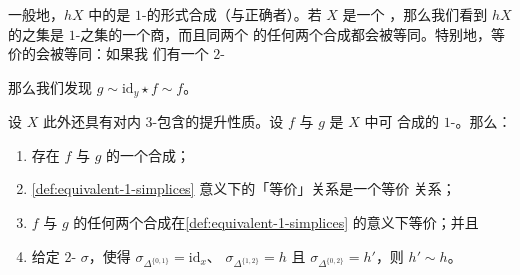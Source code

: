 \begin{observation}\label{obs:composer-hx-quotient}
一般地，$hX$ 中的\trMorphism{}是 $1$-\trSimplex{}的形式合成（\trSource{}与\trTarget{}正确者）。若 $X$ 是一个%
\trComposer{}，那么我们看到 $hX$ 的\trMorphism{}之集是 $1$-\trSimplex{}之集的一个商，而且同两个%
\trMorphism{}的任何两个合成都会被等同。特别地，等价的\trMorphism{}会被等同：如果我
们有一个 $2$-\trSimplex{}%
\begin{center}
\end{center}
那么我们发现 $g \sim \mathrm{id}_y \star f \sim f$。
\end{observation}

\begin{lemma}\label{lem:composer-inner-3-horn}
设\trComposer{} $X$ 此外还具有对内 $3$-\trHorn{}包含的提升性质。设 $f$ 与 $g$ 是 $X$ 中可
合成的 $1$-\trSimplex{}。那么：
\begin{enumerate}[label=(\arabic*)]
  \item 存在 $f$ 与 $g$ 的一个合成；
  \item \cref{def:equivalent-1-simplices} 意义下\trMorphism{}的「等价」关系是一个等价
  关系；
  \item $f$ 与 $g$ 的任何两个合成在\cref{def:equivalent-1-simplices} 的意义下等价；并且
  \item 给定 $2$-\trSimplex{} $\sigma$，使得 $\sigma_{\Delta^{\{0,1\}}} = \mathrm{id}_x$、
  $\sigma_{\Delta^{\{1,2\}}} = h$ 且 $\sigma_{\Delta^{\{0,2\}}} = h'$，则
  $h' \sim h$。
\end{enumerate}
\end{lemma}

